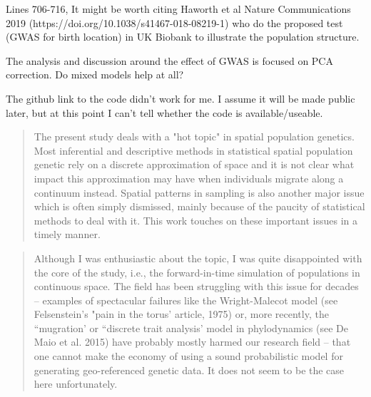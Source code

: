 \begin{point}{}
    Lines 706-716, It might be worth citing Haworth et al Nature Communications 2019 (https://doi.org/10.1038/s41467-018-08219-1) who do the proposed test (GWAS for birth location) in UK Biobank to illustrate the population structure.
\end{point}


\begin{point}{}
    The analysis and discussion around the effect of GWAS is focused on PCA correction. Do mixed models help at all?
\end{point}


\begin{point}{}
    The github link to the code didn't work for me. I assume it will be made public later, but at this point I can't tell whether the code is available/useable.
\end{point}




\begin{quote}
    The present study deals with a "hot topic" in spatial population genetics. Most
    inferential and descriptive methods in statistical spatial population
    genetic rely on a discrete approximation of space and it is not clear what
    impact this approximation may have when individuals migrate along a
    continuum instead. Spatial patterns in sampling is also another major issue
    which is often simply dismissed, mainly because of the paucity of
    statistical methods to deal with it. This work touches on these important
    issues in a timely manner.
\end{quote}

\begin{quote}
    Although I was enthusiastic about the topic, I was quite disappointed with
    the core of the study, i.e., the forward-in-time simulation of populations in
    continuous space. The field has been struggling with this issue for decades --
    examples of spectacular failures like the Wright-Malecot model (see
    Felsenstein's "pain in the torus' article, 1975) or, more recently, the
    ``mugration' or ``discrete trait analysis' model in phylodynamics (see De Maio
    et al. 2015) have probably mostly harmed our research field -- that one cannot
    make the economy of using a sound probabilistic model for generating
    geo-referenced genetic data. It does not seem to be the case here
    unfortunately.  
\end{quote}


